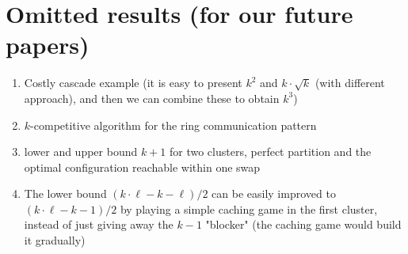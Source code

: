 \documentclass[manuscript,screen=true, review, anonymous]{acmart}
\begin{document}
\section{Omitted results (for our future papers)}

\begin{enumerate}
	\item Costly cascade example (it is easy to present $k^2$ and $k\cdot \sqrt{k}$ (with different approach), and then we can combine these to obtain $k^3$)
	
	\item $k$-competitive algorithm for the ring communication pattern
	
	\item lower and upper bound $k+1$ for two clusters, perfect partition and the optimal configuration reachable within one swap
	
	\item The lower bound $(k \cdot \ell - k - \ell) / 2$ can be easily improved to $(k \cdot \ell - k - 1) / 2$ by playing a simple caching game in the first cluster, instead of just giving away the $k-1$ "blocker" (the caching game would build it gradually)
	
\end{enumerate}
\end{document}
